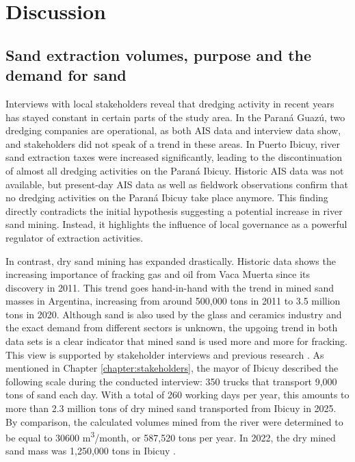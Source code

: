 \chapter{Discussion}

\section{Sand extraction volumes, purpose and the demand for sand}
Interviews with local stakeholders reveal that dredging activity in recent years has stayed constant in certain parts of the study area. In the Paraná Guazú, two dredging companies are operational, as both AIS data and interview data show, and stakeholders did not speak of a trend in these areas. In Puerto Ibicuy, river sand extraction taxes were increased significantly, leading to the discontinuation of almost all dredging activities on the Paraná Ibicuy. Historic AIS data was not available, but present-day AIS data as well as fieldwork observations confirm that no dredging activities on the Paraná Ibicuy take place anymore. This finding directly contradicts the initial hypothesis suggesting a potential increase in river sand mining. Instead, it highlights the influence of local governance as a powerful regulator of extraction activities.

In contrast, dry sand mining has expanded drastically. Historic data shows the increasing importance of fracking gas and oil from Vaca Muerta since its discovery in 2011. This trend goes hand-in-hand with the trend in mined sand masses in Argentina, increasing from around 500,000 tons in 2011 to 3.5 million tons in 2020. Although sand is also used by the glass and ceramics industry and the exact demand from different sectors is unknown, the upgoing trend in both data sets is a clear indicator that mined sand is used more and more for fracking. This view is supported by stakeholder interviews and previous research \autocite{fogliaSedArena2023} \autocite{secretariadepoliticamineraArenasParaFracking2019}. As mentioned in Chapter \ref{chapter:stakeholders}, the mayor of Ibicuy described the following scale during the conducted interview: 350 trucks that transport 9,000 tons of sand each day. With a total of 260 working days per year, this amounts to more than 2.3 million tons of dry mined sand transported from Ibicuy in 2025. By comparison, the calculated volumes mined from the river were determined to be equal to 30600 m\textsuperscript{3}/month, or 587,520 tons per year. In 2022, the dry mined sand mass was 1,250,000 tons in Ibicuy \autocite{fogliaSedArena2023}.

